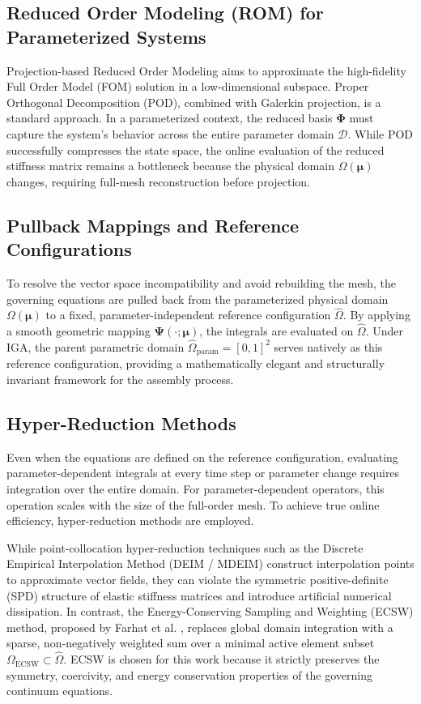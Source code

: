 \subsection{Reduced Order Modeling (ROM) for Parameterized Systems}
Projection-based Reduced Order Modeling aims to approximate the high-fidelity Full Order Model (FOM) solution in a low-dimensional subspace. Proper Orthogonal Decomposition (POD), combined with Galerkin projection, is a standard approach. In a parameterized context, the reduced basis $\boldsymbol{\Phi}$ must capture the system's behavior across the entire parameter domain $\mathcal{D}$. While POD successfully compresses the state space, the online evaluation of the reduced stiffness matrix remains a bottleneck because the physical domain $\Omega(\boldsymbol{\mu})$ changes, requiring full-mesh reconstruction before projection.

\subsection{Pullback Mappings and Reference Configurations}
To resolve the vector space incompatibility and avoid rebuilding the mesh, the governing equations are pulled back from the parameterized physical domain $\Omega(\boldsymbol{\mu})$ to a fixed, parameter-independent reference configuration $\hat{\Omega}$. By applying a smooth geometric mapping $\boldsymbol{\Psi}(\cdot; \boldsymbol{\mu})$, the integrals are evaluated on $\hat{\Omega}$. Under IGA, the parent parametric domain $\hat{\Omega}_{\text{param}} = [0, 1]^2$ serves natively as this reference configuration, providing a mathematically elegant and structurally invariant framework for the assembly process.

\subsection{Hyper-Reduction Methods}
Even when the equations are defined on the reference configuration, evaluating parameter-dependent integrals at every time step or parameter change requires integration over the entire domain. For parameter-dependent operators, this operation scales with the size of the full-order mesh. To achieve true online efficiency, hyper-reduction methods are employed. 

While point-collocation hyper-reduction techniques such as the Discrete Empirical Interpolation Method (DEIM / MDEIM) \cite{Chaturantabut2010, Bonomi2017} construct interpolation points to approximate vector fields, they can violate the symmetric positive-definite (SPD) structure of elastic stiffness matrices and introduce artificial numerical dissipation. In contrast, the Energy-Conserving Sampling and Weighting (ECSW) method, proposed by Farhat et al. \cite{Farhat2014, farhat2015}, replaces global domain integration with a sparse, non-negatively weighted sum over a minimal active element subset $\Omega_{\text{ECSW}} \subset \hat{\Omega}$. ECSW is chosen for this work because it strictly preserves the symmetry, coercivity, and energy conservation properties of the governing continuum equations.

